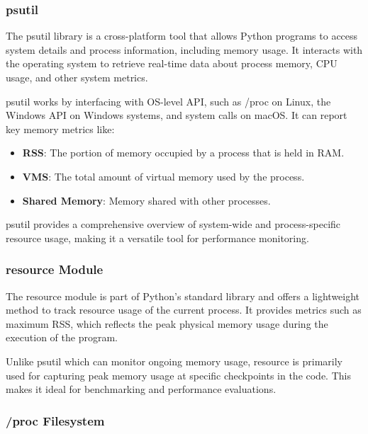 \subsubsection{psutil}

The psutil library is a cross-platform tool that allows Python programs to access system details and process information, including memory usage.
It interacts with the operating system to retrieve real-time data about process memory, \ac{CPU} usage, and other system metrics.

psutil works by interfacing with \ac{OS}-level \ac{API}, such as /proc on Linux, the Windows \ac{API} on Windows systems, and system calls on \ac{macOS}.
It can report key memory metrics like:

\begin{itemize}
    \item \textbf{\ac{RSS}}:
    The portion of memory occupied by a process that is held in \ac{RAM}.

    \item \textbf{\ac{VMS}}:
    The total amount of virtual memory used by the process.

    \item \textbf{Shared Memory}:
    Memory shared with other processes.
\end{itemize}

psutil provides a comprehensive overview of system-wide and process-specific resource usage, making it a versatile tool for performance monitoring.

\subsubsection{resource Module}

The resource module is part of Python's standard library and offers a lightweight method to track resource usage of the current process.
It provides metrics such as maximum \ac{RSS}, which reflects the peak physical memory usage during the execution of the program.

Unlike psutil which can monitor ongoing memory usage, resource is primarily used for capturing peak memory usage at specific checkpoints in the code.
This makes it ideal for benchmarking and performance evaluations.

\subsubsection{/proc Filesystem}

